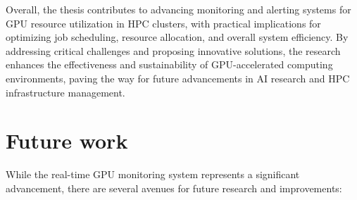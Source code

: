 Overall, the thesis contributes to advancing monitoring and alerting systems for GPU resource utilization in HPC clusters, with practical implications for optimizing job scheduling, resource allocation, and overall system efficiency. By addressing critical challenges and proposing innovative solutions, the research enhances the effectiveness and sustainability of GPU-accelerated computing environments, paving the way for future advancements in AI research and HPC infrastructure management.

\section{Future work}
While the real-time GPU monitoring system represents a significant advancement, there are several avenues for future research and improvements:

